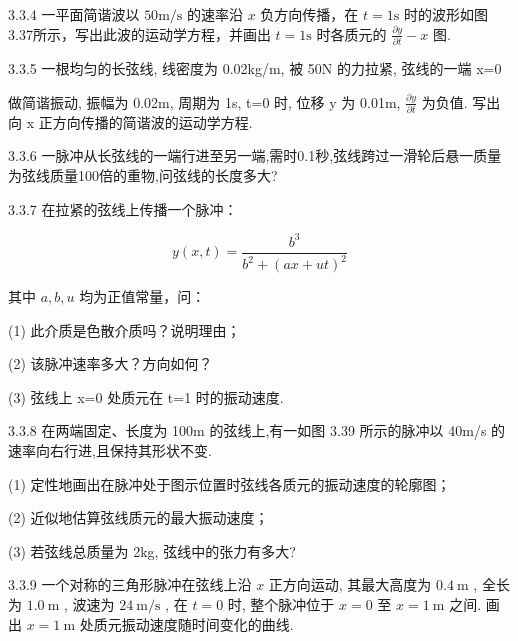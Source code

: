 \begin{problem}{3.3.4}
一平面简谐波以 $50\mathrm{m / s}$ 的速率沿 $x$ 负方向传播，在 $t = 1\mathrm{s}$ 时的波形如图3.37所示，写出此波的运动学方程，并画出 $t = 1\mathrm{s}$ 时各质元的 $\frac{\partial y}{\partial t} - x$ 图.
\begin{center}

\end{center}
\end{problem}
\clearpage


\begin{problem}{3.3.5}
一根均匀的长弦线, 线密度为 0.02kg/m, 被 50N 的力拉紧, 弦线的一端 x=0

做简谐振动, 振幅为 0.02m, 周期为 1s, t=0 时, 位移 y 为 0.01m, $\frac{\partial y}{\partial t}$ 为负值. 写出向 x 正方向传播的简谐波的运动学方程.
\end{problem}
\clearpage


\begin{problem}{3.3.6}
一脉冲从长弦线的一端行进至另一端,需时0.1秒,弦线跨过一滑轮后悬一质量为弦线质量100倍的重物,问弦线的长度多大?
\end{problem}
\clearpage


\begin{problem}{3.3.7}
在拉紧的弦线上传播一个脉冲：

\[
y (x, t) = \frac {b ^ {3}}{b ^ {2} + (a x + u t) ^ {2}}
\]

其中 $a, b, u$ 均为正值常量，问：

(1) 此介质是色散介质吗？说明理由；

(2) 该脉冲速率多大？方向如何？

(3) 弦线上 x=0 处质元在 t=1 时的振动速度.
\end{problem}
\clearpage


\begin{problem}{3.3.8}
在两端固定、长度为 100m 的弦线上,有一如图 3.39 所示的脉冲以 40m/s 的速率向右行进,且保持其形状不变.

(1) 定性地画出在脉冲处于图示位置时弦线各质元的振动速度的轮廓图；

(2) 近似地估算弦线质元的最大振动速度；

(3) 若弦线总质量为 2kg, 弦线中的张力有多大?
\begin{center}

\end{center}
\end{problem}
\clearpage


\begin{problem}{3.3.9}
一个对称的三角形脉冲在弦线上沿 $x$ 正方向运动, 其最大高度为 $0.4 \mathrm{~m}$ , 全长为 $1.0 \mathrm{~m}$ , 波速为 $24 \mathrm{~m} / \mathrm{s}$ , 在 $t = 0$ 时, 整个脉冲位于 $x = 0$ 至 $x = 1 \mathrm{~m}$ 之间. 画出 $x = 1 \mathrm{~m}$ 处质元振动速度随时间变化的曲线.
\end{problem}
\clearpage


